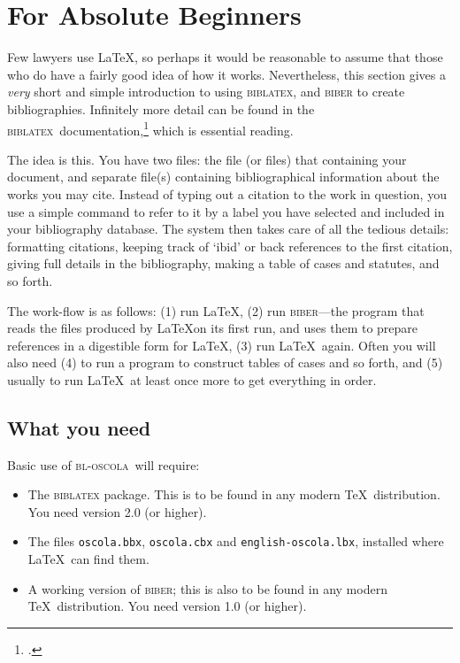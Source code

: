 \documentclass[a4paper,
               11pt,
	       DIV=1,			   
	       footinclude=false]
	      {scrartcl}
\newcommand{\oscola}{\textsc{bl-oscola}}
\newcommand{\biblatex}{\textsc{biblatex}}
\begin{document}
\section{For Absolute Beginners}

Few lawyers use \LaTeX,
so perhaps it would be reasonable to assume that those who do have a
fairly good idea of how it works. Nevertheless, this section gives a
\emph{very} short and simple introduction to using \biblatex, and
\textsc{biber} to create bibliographies. Infinitely more detail can be
found in the \biblatex\ documentation,\footcite{biblatex2} which is
essential reading.

The idea is this. You have two files: the file (or files) that
containing your document, and separate file(s) containing
bibliographical information about the works you may cite. Instead of
typing out a citation to the work in question, you use a simple
command to refer to it by a label you have selected and included in
your bibliography database. The system then takes care of all the
tedious details: formatting citations, keeping track of `ibid' or back
references to the first citation, giving full details in the
bibliography, making a table of cases and statutes, and so forth.

The work-flow is as follows: (1)
run \LaTeX, (2) run \textsc{biber}---the program that reads the files
produced by \LaTeX on its first run, and uses them to prepare
references in a digestible form for \LaTeX, (3) run \LaTeX\
again. Often you will also need (4) to run a program to construct
tables of cases and so forth, and (5) usually to run \LaTeX\ at least
once more to get everything in
order.

\subsection{What you need}

Basic use of \oscola\ will require:
\begin{itemize}
\item The \textsc{biblatex} package. This is to be found in any modern
  \TeX\ distribution. You need version 2.0 (or higher).
\item The files \texttt{oscola.bbx}, \texttt{oscola.cbx} and
  \texttt{english-oscola.lbx}, installed where \LaTeX\ can find them.
\item A working version of \textsc{biber}; this is also to be found in
  any modern \TeX\ distribution. You need version 1.0 (or higher).
\end{itemize}
\end{document}
